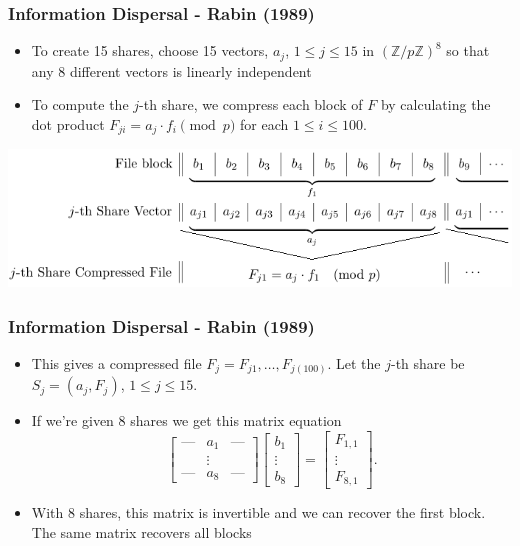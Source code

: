 \documentclass{beamer}
\newcommand{\integers}{\mathbb{Z}}
\begin{document}
\begin{frame}
	\frametitle{Information Dispersal - Rabin (1989)}
	\begin{itemize}
		\item To create 15 shares, choose 15 vectors, $a_j$, $1\leq j\leq 15$ in $(\integers/p\integers)^8$ so that any 8 different vectors is linearly independent\pause

		\item To compute the $j$-th share, we compress each block of $F$ by calculating the dot product $F_{ji} = a_j\cdot f_i\pmod{p}$ for each $1\leq i\leq 100$.\pause
	\end{itemize}
	\vspace{.5cm}
	\centering
	\includegraphics[scale=.5]{rabin_compression.png}
\end{frame}

\begin{frame}
	\frametitle{Information Dispersal - Rabin (1989)}
	\begin{itemize}
		\item This gives a compressed file $F_j = F_{j1}, \ldots, F_{j(100)}$. Let the $j$-th share be $S_j = (a_j, F_j)$, $1\leq j\leq 15$.\pause
		\item If we're given 8 shares we get this matrix equation
		\[
		\begin{bmatrix}
			\text{---} & a_1 & \text{---}\\
			&\vdots&\\
			\text{---} & a_8 & \text{---}
		\end{bmatrix}
		\begin{bmatrix}
			b_1\\
			\vdots\\
			b_8
		\end{bmatrix}=
		\begin{bmatrix}
			F_{1,1}\\
			\vdots\\
			F_{8,1}
		\end{bmatrix}.
		\]\pause
		\item With 8 shares, this matrix is invertible and we can recover the first block. The same matrix recovers all blocks
	\end{itemize}
\end{frame}
\end{document}
